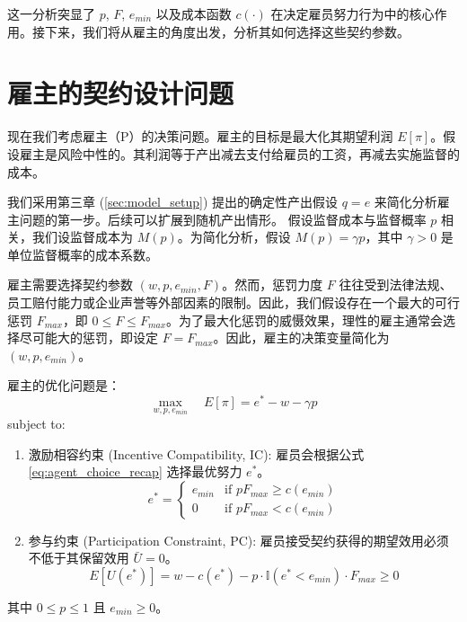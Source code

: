 这一分析突显了 $p$, $F$, $e_{min}$ 以及成本函数 $c(\cdot)$ 在决定雇员努力行为中的核心作用。接下来，我们将从雇主的角度出发，分析其如何选择这些契约参数。

\section{雇主的契约设计问题}
\label{sec:principal_problem}

现在我们考虑雇主（P）的决策问题。雇主的目标是最大化其期望利润 $E[\pi]$。假设雇主是风险中性的。其利润等于产出减去支付给雇员的工资，再减去实施监督的成本。

我们采用第三章 (\ref{sec:model_setup}) 提出的确定性产出假设 $q=e$ 来简化分析雇主问题的第一步。后续可以扩展到随机产出情形。
假设监督成本与监督概率 $p$ 相关，我们设监督成本为 $M(p)$。为简化分析，假设 $M(p) = \gamma p$，其中 $\gamma > 0$ 是单位监督概率的成本系数。

雇主需要选择契约参数 $(w, p, e_{min}, F)$。然而，惩罚力度 $F$ 往往受到法律法规、员工赔付能力或企业声誉等外部因素的限制。因此，我们假设存在一个最大的可行惩罚 $F_{max}$，即 $0 \le F \le F_{max}$。为了最大化惩罚的威慑效果，理性的雇主通常会选择尽可能大的惩罚，即设定 $F = F_{max}$。因此，雇主的决策变量简化为 $(w, p, e_{min})$。

雇主的优化问题是：
\begin{equation}
\max_{w, p, e_{min}} \quad E[\pi] = e^* - w - \gamma p
\end{equation}
subject to:
\begin{enumerate}
    \item 激励相容约束 (Incentive Compatibility, IC): 雇员会根据公式 \ref{eq:agent_choice_recap} 选择最优努力 $e^*$。
    \begin{equation} \label{eq:ic_constraint}
    e^* = \begin{cases} e_{min} & \text{if } p F_{max} \ge c(e_{min}) \\ 0 & \text{if } p F_{max} < c(e_{min}) \end{cases}
    \end{equation}
    \item 参与约束 (Participation Constraint, PC): 雇员接受契约获得的期望效用必须不低于其保留效用 $\bar{U}=0$。
    \begin{equation} \label{eq:pc_constraint}
    E[U(e^*)] = w - c(e^*) - p \cdot \mathbb{I}(e^* < e_{min}) \cdot F_{max} \ge 0
    \end{equation}
\end{enumerate}
其中 $0 \le p \le 1$ 且 $e_{min} \ge 0$。


